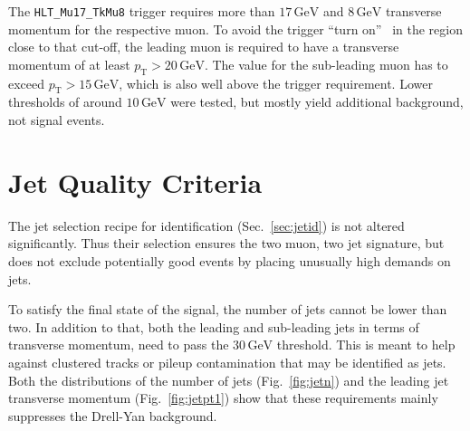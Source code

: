 The \verb+HLT_Mu17_TkMu8+ trigger requires more than $17\,\text{GeV}$ and $8\,\text{GeV}$ transverse momentum for the respective muon. To avoid the trigger ``turn on''~\cite{trigeff} in the region close to that cut-off, the leading muon is required to have a transverse momentum of at least $p_{\text{T}} > 20\,\text{GeV}$. The value for the sub-leading muon has to exceed $p_{\text{T}} > 15\,\text{GeV}$, which is also well above the trigger requirement. Lower thresholds of around $10\,\text{GeV}$ were tested, but mostly yield additional background, not signal events. 

\section{Jet Quality Criteria}
\label{sec:jetqualy}

The jet selection recipe for identification (Sec.~\ref{sec:jetid}) is not altered significantly. Thus their selection ensures the two muon, two jet signature, but does not exclude potentially good events by placing unusually high demands on jets.

To satisfy the final state of the signal, the number of jets cannot be lower than two. In addition to that, both the leading and sub-leading jets in terms of transverse momentum, need to pass the $30\,\text{GeV}$ threshold. This is meant to help against clustered tracks or pileup contamination that may be identified as jets. Both the distributions of the number of jets (Fig.~\ref{fig:jetn}) and the leading jet transverse momentum (Fig.~\ref{fig:jetpt1}) show that these requirements mainly suppresses the Drell-Yan background.

